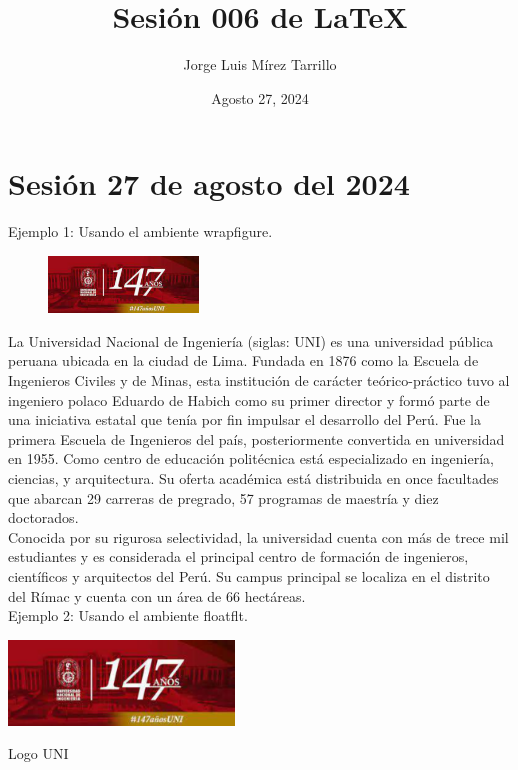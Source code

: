 \documentclass{article}
\title{Sesión 006 de LaTeX}
\author{Jorge Luis Mírez Tarrillo}
\date{Agosto 27, 2024}
\begin{document}
\maketitle

\section*{Sesión 27 de agosto del 2024}

Ejemplo 1: Usando el ambiente wrapfigure. \\

\begin{figure}
    \includegraphics[width=4cm]{UNI_logo_147.pdf}
\end{figure}

La Universidad Nacional de Ingeniería (siglas: UNI) es una universidad pública peruana ubicada en la ciudad de Lima. Fundada en 1876 como la Escuela de Ingenieros Civiles y de Minas, esta institución de carácter teórico-práctico tuvo al ingeniero polaco Eduardo de Habich como su primer director y formó parte de una iniciativa estatal que tenía por fin impulsar el desarrollo del Perú. Fue la primera Escuela de Ingenieros del país, posteriormente convertida en universidad en 1955. Como centro de educación politécnica está especializado en ingeniería, ciencias, y arquitectura. Su oferta académica está distribuida en once facultades que abarcan 29 carreras de pregrado, 57 programas de maestría y diez doctorados. \\

Conocida por su rigurosa selectividad, la universidad cuenta con más de trece mil estudiantes y es considerada el principal centro de formación de ingenieros, científicos y arquitectos del Perú. Su campus principal se localiza en el distrito del Rímac y cuenta con un área de 66 hectáreas. \\

Ejemplo 2: Usando el ambiente floatflt. \\

\begin{floatingfigure}[l]{8.0 cm}
    \includegraphics[width=6cm]{UNI_logo_147.pdf}
    \caption{Logo UNI}
    \label{Figura}
\end{floatingfigure}
\end{document}
